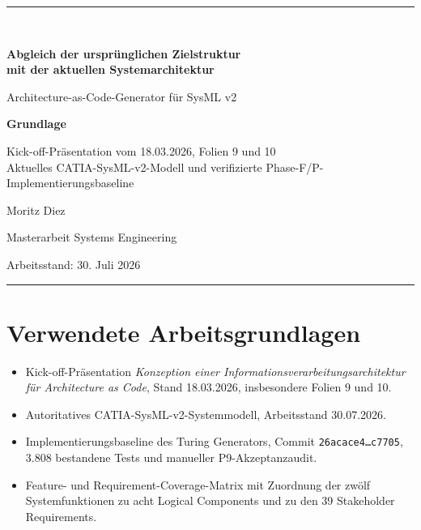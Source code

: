 \documentclass[11pt,a4paper]{scrartcl}
\begin{document}
\begin{titlepage}
  \centering
  \vspace*{2.0cm}
  {\color{TuringBlue}\rule{\textwidth}{1.2pt}}\\[1.2cm]
  {\Huge\bfseries\color{TuringBlue} Abgleich der ursprünglichen Zielstruktur\\[3mm]
  mit der aktuellen Systemarchitektur\par}
  \vspace{0.9cm}
  {\Large Architecture-as-Code-Generator für SysML v2\par}
  \vspace{1.4cm}
  \begin{tcolorbox}[
    width=0.82\textwidth,
    colback=blue!3,
    colframe=TuringBlue,
    arc=2mm,
    boxrule=0.8pt
  ]
  \centering
  \textbf{Grundlage}\par
  Kick-off-Präsentation vom 18.03.2026, Folien 9 und 10\\
  Aktuelles CATIA-SysML-v2-Modell und verifizierte Phase-F/P-Implementierungsbaseline
  \end{tcolorbox}
  \vfill
  {\large Moritz Diez\par}
  \vspace{3mm}
  {\normalsize Masterarbeit Systems Engineering\par}
  \vspace{8mm}
  {\normalsize Arbeitsstand: 30. Juli 2026\par}
  \vspace{1.3cm}
  {\color{TuringBlue}\rule{\textwidth}{1.2pt}}
\end{titlepage}

\tableofcontents
\clearpage



\clearpage
\section*{Verwendete Arbeitsgrundlagen}
\begin{itemize}[leftmargin=7mm,itemsep=2mm]
  \item Kick-off-Präsentation \emph{Konzeption einer Informationsverarbeitungsarchitektur für Architecture as Code}, Stand 18.03.2026, insbesondere Folien 9 und 10.
  \item Autoritatives CATIA-SysML-v2-Systemmodell, Arbeitsstand 30.07.2026.
  \item Implementierungsbaseline des Turing Generators, Commit \texttt{26acace4\ldots c7705}, 3.808 bestandene Tests und manueller P9-Akzeptanzaudit.
  \item Feature- und Requirement-Coverage-Matrix mit Zuordnung der zwölf Systemfunktionen zu acht Logical Components und zu den 39 Stakeholder Requirements.
\end{itemize}
\end{document}
